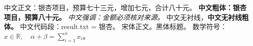 \documentclass[UTF8,fontset=claurst]{ctexart}
\begin{document}
中文正文：银杏项目，预算七十三元，增加七元，合计八十元。
\textbf{中文粗体：银杏项目，预算八十元。}
\emph{中文强调：金额必须核对来源。}
{\sffamily 中文无衬线，\textbf{中文无衬线粗体。}}
{\ttfamily 中文代码段：result.txt = 银杏。}
{\songti 宋体正文。}{\heiti 黑体标题。}
数学符号：\(x\in\mathbb{R},\quad\alpha+\beta=\sum_{i=1}^{n}x_i\)。
\end{document}

